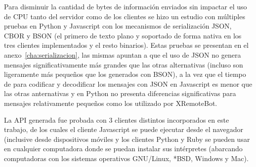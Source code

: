 Para disminuir la cantidad de bytes de información enviados sin impactar el
uso de CPU tanto del servidor como de los clientes se hizo un estudio con
múltiples pruebas en Python y Javascript con los mecanismos de serialización
JSON, CBOR y BSON (el primero de texto plano y soportado de forma nativa en los
tres clientes implementados y el resto binarios). Estas pruebas se presentan
en el anexo~\ref{cha:serializacion}, las mismas apuntan a que el uso de JSON
no genera mensajes significativamente más grandes que las otras alternativas
(incluso son ligeramente más pequeños que los generados con BSON), a la vez
que el tiempo de para codificar y decodificar los mensajes con JSON en
Javascript es menor que las otras anternativas y en Python no presenta
diferencias significativas para mensajes relativamente pequeños como los utilizado
por XRemoteBot.

La API generada fue probada con 3 clientes distintos incorporados en este
trabajo, de los cuales el cliente Javascript se puede ejecutar desde el
navegador (inclusive desde dispositivos móviles y los clientes Python y
Ruby se pueden usar en cualquier computadora
donde se puedan instalar sus intérpretes (abarcando computadoras con
los sistemas operativos GNU/Linux, *BSD, Windows y Mac).

